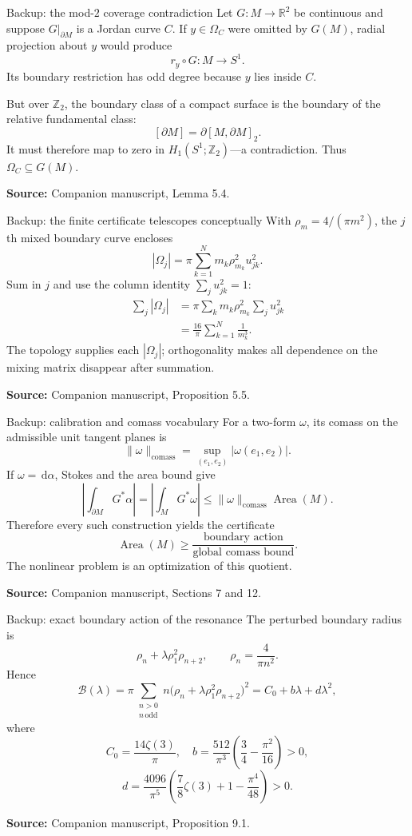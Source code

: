 \documentclass[11pt,aspectratio=169,usepdftitle=false]{beamer}
\newcommand{\R}{\mathbb R}
\newcommand{\Area}{\operatorname{Area}}
\newcommand{\dd}{\,\mathrm d}
\newcommand{\sourcefoot}[1]{\par\vfill{\tiny\color{Slate}\textbf{Source:} #1}}
\begin{document}
\begin{frame}{Backup: the mod-$2$ coverage contradiction}\label{bk:mod2}
  Let $G:M\to\R^2$ be continuous and suppose $G|_{\partial M}$ is a Jordan
  curve $C$. If $y\in\Omega_C$ were omitted by $G(M)$, radial projection about
  $y$ would produce
  \[
    r_y\circ G:M\longrightarrow S^1.
  \]
  Its boundary restriction has odd degree because $y$ lies inside $C$.

  But over $\mathbb Z_2$, the boundary class of a compact surface is the
  boundary of the relative fundamental class:
  \[
    [\partial M]=\partial[M,\partial M]_2.
  \]
  It must therefore map to zero in $H_1(S^1;\mathbb Z_2)$---a contradiction.
  Thus $\Omega_C\subseteq G(M)$.
  \sourcefoot{Companion manuscript, Lemma 5.4.}
\end{frame}

\begin{frame}{Backup: the finite certificate telescopes conceptually}\label{bk:finite-certificate}
  With $\rho_m=4/(\pi m^2)$, the $j$th mixed boundary curve encloses
  \[
    |\Omega_j|=\pi\sum_{k=1}^{N}m_k\rho_{m_k}^2u_{jk}^2.
  \]
  Sum in $j$ and use the column identity $\sum_j u_{jk}^2=1$:
  \begin{align*}
    \sum_j|\Omega_j|
    &=\pi\sum_km_k\rho_{m_k}^2\sum_ju_{jk}^2\\
    &=\frac{16}{\pi}\sum_{k=1}^{N}\frac1{m_k^3}.
  \end{align*}
  The topology supplies each $|\Omega_j|$; orthogonality makes all dependence
  on the mixing matrix disappear after summation.
  \sourcefoot{Companion manuscript, Proposition 5.5.}
\end{frame}

\begin{frame}{Backup: calibration and comass vocabulary}\label{bk:comass}
  For a two-form $\omega$, its comass on the admissible unit tangent planes is
  \[
    \|\omega\|_{\mathrm{comass}}
    =\sup_{(e_1,e_2)}|\omega(e_1,e_2)|.
  \]
  If $\omega=\dd\alpha$, Stokes and the area bound give
  \[
    \left|\int_{\partial M}G^*\alpha\right|
    =\left|\int_MG^*\omega\right|
    \le\|\omega\|_{\mathrm{comass}}\Area(M).
  \]
  Therefore every such construction yields the certificate
  \[
    \boxed{\Area(M)\ge
    \frac{\text{boundary action}}{\text{global comass bound}}.}
  \]
  The nonlinear problem is an optimization of this quotient.
  \sourcefoot{Companion manuscript, Sections 7 and 12.}
\end{frame}

\begin{frame}{Backup: exact boundary action of the resonance}\label{bk:boundary-action}
  The perturbed boundary radius is
  \[
    \rho_n+\lambda\rho_1^2\rho_{n+2},
    \qquad \rho_n=\frac4{\pi n^2}.
  \]
  Hence
  \[
    \mathcal B(\lambda)
    =\pi\sum_{\substack{n>0\\ n\,\mathrm{odd}}}
    n\bigl(\rho_n+\lambda\rho_1^2\rho_{n+2}\bigr)^2
    =C_0+b\lambda+d\lambda^2,
  \]
  where
  \[
    C_0=\frac{14\zeta(3)}\pi,
    \quad
    b=\frac{512}{\pi^3}\left(\frac34-\frac{\pi^2}{16}\right)>0,
  \]
  \[
    d=\frac{4096}{\pi^5}
    \left(\frac78\zeta(3)+1-\frac{\pi^4}{48}\right)>0.
  \]
  \sourcefoot{Companion manuscript, Proposition 9.1.}
\end{frame}
\end{document}
